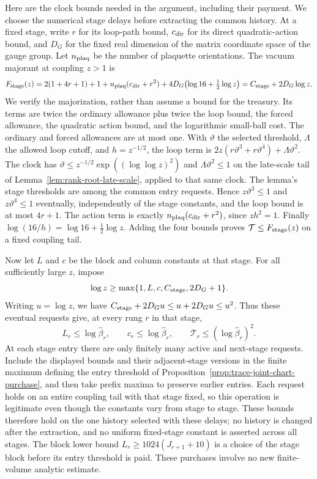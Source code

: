 Here are the clock bounds needed in the argument, including their
payment. We choose the numerical stage delays before extracting the
common history. At a fixed stage, write $r$ for its loop-path bound,
$c_{\rm dir}$ for its direct quadratic-action bound, and $D_G$ for the
fixed real dimension of the matrix coordinate space of the gauge group.
Let $n_{\rm plaq}$ be the number of plaquette orientations. The vacuum
majorant at coupling $z>1$ is
\[
 F_{\rm stage}(z)
 =2(1+4r+1)+1+n_{\rm plaq}(c_{\rm dir}+r^2)
       +4D_G\bigl(\log16+\tfrac12\log z\bigr)
 =C_{\rm stage}+2D_G\log z.
\]
We verify the majorization, rather than assume a bound for the treasury.
Its terms are twice the ordinary allowance plus twice the loop bound,
the forced allowance, the quadratic action bound, and the logarithmic
small-ball cost. The ordinary and forced allowances are at most one.
With $\vartheta$ the selected threshold, $\Lambda$ the allowed loop
cutoff, and $h=z^{-1/2}$, the loop term is
$2z(r\vartheta^3+r\vartheta^4)+\Lambda\vartheta^2$.
The clock has $\vartheta\le z^{-1/2}\exp((\log\log z)^2)$ and
$\Lambda\vartheta^2\le1$ on the late-scale tail of
Lemma~\ref{lem:rank-root-late-scale}, applied to that same clock.
The lemma's stage thresholds are among the common entry requests.
Hence $z\vartheta^3\le1$ and
$z\vartheta^4\le1$ eventually, independently of the stage constants,
and the loop bound is at most $4r+1$.
The action term is exactly $n_{\rm plaq}(c_{\rm dir}+r^2)$,
since $zh^2=1$. Finally $\log(16/h)=\log16+\tfrac12\log z$.
Adding the four bounds proves $\mathcal T\le F_{\rm stage}(z)$
on a fixed coupling tail.

Now let $L$ and $c$ be the block and column constants at that stage.
For all sufficiently large $z$, impose
\[
 \log z\ge\max\{1,L,c,C_{\rm stage},2D_G+1\}.
\]
Writing $u=\log z$, we have
$C_{\rm stage}+2D_Gu\le u+2D_Gu\le u^2$.
Thus these eventual requests give, at every rung $r$ in that stage,
\[
 L_r\le\log\widehat\beta_r,\qquad
 c_r\le\log\widehat\beta_r,\qquad
 \mathcal T_r\le(\log\widehat\beta_r)^2.
\]
At each stage entry there are only finitely many active and next-stage
requests. Include the displayed bounds and their adjacent-stage versions
in the finite maximum defining the entry threshold of
Proposition~\ref{prop:trace-joint-chart-purchase}, and then take prefix
maxima to preserve earlier entries. Each request holds on an entire
coupling tail with that stage fixed, so this operation is legitimate even
though the constants vary from stage to stage. These bounds therefore
hold on the one history selected with these delays; no history is changed
after the extraction, and no uniform fixed-stage constant is asserted
across all stages.
The block lower bound $L_r\ge1024(J_{r+1}+10)$ is a choice of the
stage block before its entry threshold is paid. These purchases involve
no new finite-volume analytic estimate.

